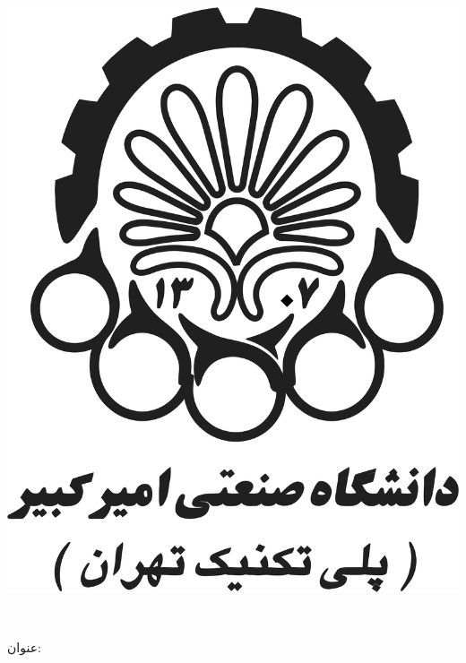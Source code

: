 
\begin{center}

\includegraphics[scale=0.2]{logo/logo.png}

\vspace{0.3cm}
\large\ThesisDepartment\\

\begin{large}
\vspace{0.5cm}



\end{large}

\vspace{1.5cm}

{عنوان:}\\[1.2em]
{\LARGE\textbf{\ThesisTitle}}\\ 
\vspace{1cm}


\end{center}
